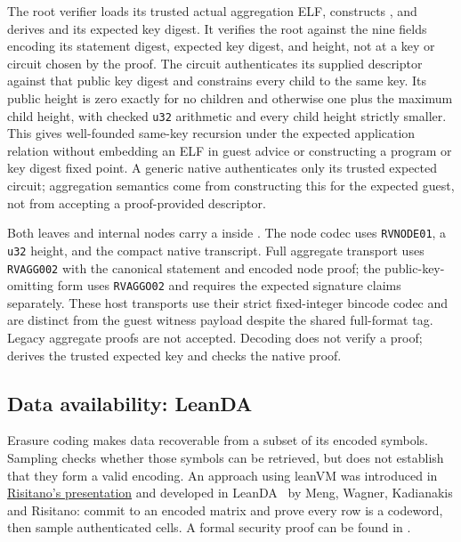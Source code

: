 The root verifier loads its trusted actual aggregation ELF, constructs , and derives  and its expected key digest. It verifies the root against the nine fields encoding its statement digest, expected key digest, and height, not at a key or circuit chosen by the proof. The circuit authenticates its supplied descriptor against that public key digest and constrains every child to the same key. Its public height is zero exactly for no children and otherwise one plus the maximum child height, with checked \texttt{u32} arithmetic and every child height strictly smaller. This gives well-founded same-key recursion under the expected application relation without embedding an ELF in guest advice or constructing a program or key digest fixed point. A generic native  authenticates only its trusted expected circuit; aggregation semantics come from constructing this  for the expected guest, not from accepting a proof-provided descriptor.

Both leaves and internal nodes carry a  inside . The node codec uses \texttt{RVNODE01}, a \texttt{u32} height, and the compact native transcript. Full aggregate transport uses \texttt{RVAGG002} with the canonical statement and encoded node proof; the public-key-omitting form uses \texttt{RVAGGO02} and requires the expected signature claims separately. These host transports use their strict fixed-integer bincode codec and are distinct from the guest witness payload despite the shared full-format tag. Legacy aggregate proofs are not accepted. Decoding does not verify a proof;  derives the trusted expected key and checks the native proof.

\subsection{Data availability: LeanDA}\label{sec:leanda}

Erasure coding makes data recoverable from a subset of its encoded symbols. Sampling checks whether those symbols can be retrieved, but does not establish that they form a valid encoding. An approach using leanVM was introduced in \href{https://frisitano.github.io/slides/presentations/leanvm-fold-in-circuit-das-2026-05-08/index.html}{Risitano's presentation} and developed in LeanDA~\cite{LeanDA} by Meng, Wagner, Kadianakis and Risitano: commit to an encoded matrix and prove every row is a codeword, then sample authenticated cells. A formal security proof can be found in \cite{LeanDASecurity}.

